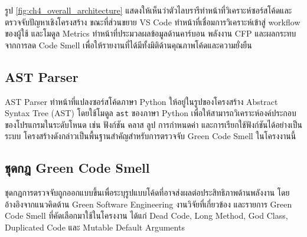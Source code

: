 รูป \ref{fig:ch4_overall_architecture} แสดงให้เห็นว่าตัวไลบรารีทำหน้าที่วิเคราะห์ซอร์สโค้ดและตรวจจับปัญหาเชิงโครงสร้าง ขณะที่ส่วนขยาย VS Code ทำหน้าที่เชื่อมการวิเคราะห์เข้าสู่ workflow ของผู้ใช้ และโมดูล Metrics ทำหน้าที่ประมวลผลข้อมูลด้านคาร์บอน พลังงาน CFP และผลกระทบจากการลด Code Smell เพื่อให้รายงานที่ได้มีทั้งมิติด้านคุณภาพโค้ดและความยั่งยืน

\subsection{AST Parser}
AST Parser ทำหน้าที่แปลงซอร์สโค้ดภาษา Python ให้อยู่ในรูปของโครงสร้าง {\italicfont Abstract Syntax Tree (AST)} โดยใช้โมดูล \texttt{ast} ของภาษา Python เพื่อให้สามารถวิเคราะห์องค์ประกอบของโปรแกรมในระดับโหนด เช่น ฟังก์ชัน คลาส ลูป การกำหนดค่า และการเรียกใช้ฟังก์ชันได้อย่างเป็นระบบ โครงสร้างดังกล่าวเป็นพื้นฐานสำคัญสำหรับการตรวจจับ Green Code Smell ในโครงงานนี้



\subsection{ชุดกฎ Green Code Smell}
ชุดกฎการตรวจจับถูกออกแบบขึ้นเพื่อระบุรูปแบบโค้ดที่อาจส่งผลต่อประสิทธิภาพด้านพลังงาน โดยอ้างอิงจากแนวคิดด้าน {\italicfont Green Software Engineering} งานวิจัยที่เกี่ยวข้อง และรายการ Green Code Smell ที่คัดเลือกมาใช้ในโครงงาน ได้แก่ {\italicfont Dead Code}, {\italicfont Long Method}, {\italicfont God Class}, {\italicfont Duplicated Code} และ {\italicfont Mutable Default Arguments}

